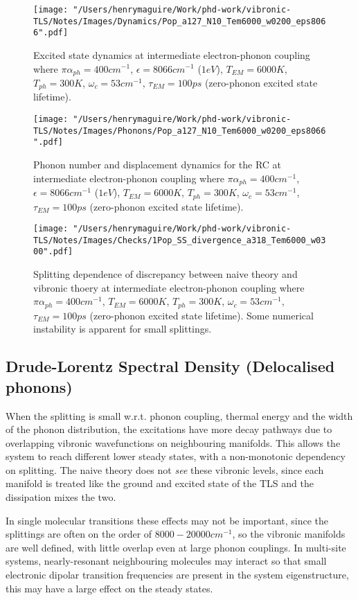 \documentclass[]{article}
\begin{document}
\begin{figure}
	\texttt{[image: "/Users/henrymaguire/Work/phd-work/vibronic-TLS/Notes/Images/Dynamics/Pop\_a127\_N10\_Tem6000\_w0200\_eps8066".pdf]}
	\caption{Excited state dynamics at intermediate electron-phonon coupling where $\pi\alpha_{ph}=400cm^{-1}$, $\epsilon=8066cm^{-1}$ ($1eV$), $T_{EM}=6000K$, $T_{ph}=300K$, $\omega_c=53cm^{-1}$, $\tau_{EM}=100ps$ (zero-phonon excited state lifetime).}
	\label{fig:}
\end{figure}
\begin{figure}
	\texttt{[image: "/Users/henrymaguire/Work/phd-work/vibronic-TLS/Notes/Images/Phonons/Pop\_a127\_N10\_Tem6000\_w0200\_eps8066".pdf]}
	\caption{Phonon number and displacement dynamics for the RC at intermediate electron-phonon coupling where $\pi\alpha_{ph}=400cm^{-1}$, $\epsilon=8066cm^{-1}$ ($1eV$), $T_{EM}=6000K$, $T_{ph}=300K$, $\omega_c=53cm^{-1}$, $\tau_{EM}=100ps$ (zero-phonon excited state lifetime).}
	\label{fig:}
\end{figure}
\begin{figure}
	\texttt{[image: "/Users/henrymaguire/Work/phd-work/vibronic-TLS/Notes/Images/Checks/1Pop\_SS\_divergence\_a318\_Tem6000\_w0300".pdf]}
	\caption{Splitting dependence of discrepancy between naive theory and vibronic thoery at intermediate electron-phonon coupling where $\pi\alpha_{ph}=400cm^{-1}$, $T_{EM}=6000K$, $T_{ph}=300K$, $\omega_c=53cm^{-1}$, $\tau_{EM}=100ps$ (zero-phonon excited state lifetime). Some numerical instability is apparent for small splittings.}
	\label{fig:steadystateSplittingDependence} 
\end{figure}

\subsection{Drude-Lorentz Spectral Density (Delocalised phonons)}

When the splitting is small w.r.t. phonon coupling, thermal energy and the width of the phonon distribution, the excitations have more decay pathways due to overlapping vibronic wavefunctions on neighbouring manifolds. This allows the system to reach different lower steady states, with a non-monotonic dependency on splitting. The naive theory does not \emph{see} these vibronic levels, since each manifold is treated like the ground and excited state of the TLS and the dissipation mixes the two.

In single molecular transitions these effects may not be important, since the splittings are often on the order of $8000-20000 cm^{-1}$, so the vibronic manifolds are well defined, with little overlap even at large phonon couplings. In multi-site systems, nearly-resonant neighbouring molecules may interact so that small electronic dipolar transition frequencies are present in the system eigenstructure, this may have a large effect on the steady states.
\end{document}
